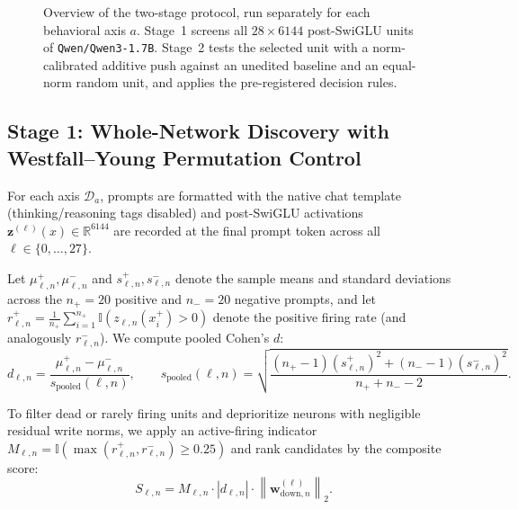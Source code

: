 \documentclass[11pt, a4paper]{article}
\begin{document}
\begin{figure}[t]
    \caption{Overview of the two-stage protocol, run separately for each behavioral axis $a$. Stage~1 screens all $28 \times 6144$ post-SwiGLU units of \texttt{Qwen/\allowbreak{}Qwen3-1.7B}. Stage~2 tests the selected unit with a norm-calibrated additive push against an unedited baseline and an equal-norm random unit, and applies the pre-registered decision rules.}
    \label{fig:pipeline}
\end{figure}

\subsection{Stage 1: Whole-Network Discovery with Westfall--Young Permutation Control}

For each axis $\mathcal{D}_a$, prompts are formatted with the native chat template (thinking/reasoning tags disabled) and post-SwiGLU activations $\mathbf{z}^{(\ell)}(x) \in \mathbb{R}^{6144}$ are recorded at the final prompt token across all $\ell \in \{0, \dots, 27\}$.

Let $\mu_{\ell,n}^+, \mu_{\ell,n}^-$ and $s_{\ell,n}^+, s_{\ell,n}^-$ denote the sample means and standard deviations across the $n_+ = 20$ positive and $n_- = 20$ negative prompts, and let $r_{\ell,n}^+ = \frac{1}{n_+}\sum_{i=1}^{n_+} \mathbb{I}(z_{\ell,n}(x_i^+) > 0)$ denote the positive firing rate (and analogously $r_{\ell,n}^-$). We compute pooled Cohen's $d$:
\begin{equation}\label{eq:cohen}
    d_{\ell,n} = \frac{\mu_{\ell,n}^+ - \mu_{\ell,n}^-}{s_{\mathrm{pooled}}(\ell,n)}, \qquad
    s_{\mathrm{pooled}}(\ell,n) = \sqrt{\frac{(n_+ - 1)(s_{\ell,n}^+)^2 + (n_- - 1)(s_{\ell,n}^-)^2}{n_+ + n_- - 2}}.
\end{equation}

To filter dead or rarely firing units and deprioritize neurons with negligible residual write norms, we apply an active-firing indicator $M_{\ell,n} = \mathbb{I}\!\left(\max(r_{\ell,n}^+, r_{\ell,n}^-) \ge 0.25\right)$ and rank candidates by the composite score:
\begin{equation}\label{eq:score}
    S_{\ell,n} = M_{\ell,n} \cdot |d_{\ell,n}| \cdot \left\|\mathbf{w}_{\mathrm{down}, n}^{(\ell)}\right\|_2.
\end{equation}
\end{document}
